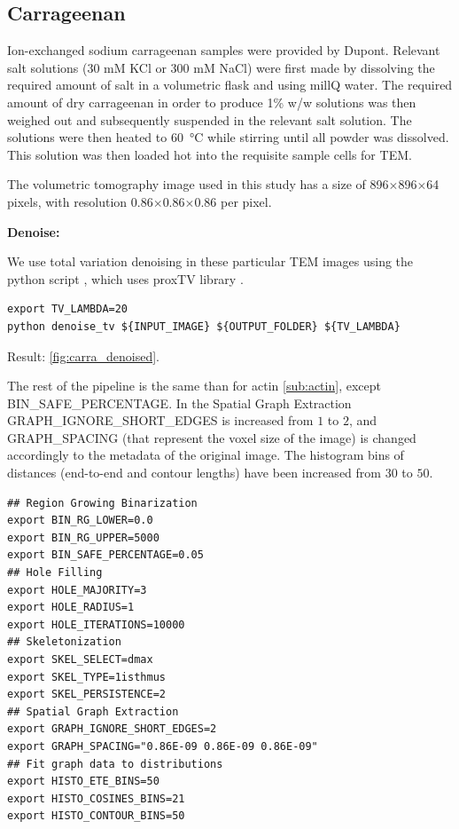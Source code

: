 \subsection{Carrageenan}%
\label{sub:carrageenan}


Ion-exchanged sodium carrageenan samples were provided by Dupont. Relevant salt solutions (30 mM KCl  or 300 mM NaCl) were first made by dissolving the required amount of salt in a volumetric flask and using millQ water. The required amount of dry carrageenan in order to produce 1\% w/w solutions was then weighed out and subsequently suspended in the relevant salt solution. The solutions were then heated to \SI{60}{\degreeCelsius} while stirring until all powder was dissolved. This solution was then loaded hot into the requisite sample cells for \gls{TEM}.

The volumetric tomography image used in this study has a size of 896$\times$896$\times$64 pixels, with resolution 0.86$\times$0.86$\times$0.86 \nm per pixel.

\textbf{Denoise:}

We use total variation denoising in these particular TEM images using the python script  \cite{phcerdan_denoise_tv_2018}, which uses proxTV library \cite{barbero_modular_2014}.

\begin{verbatim}
export TV_LAMBDA=20
python denoise_tv ${INPUT_IMAGE} ${OUTPUT_FOLDER} ${TV_LAMBDA}
\end{verbatim}

Result: \autoref{fig:carra_denoised}.

The rest of the pipeline is the same than for actin \autoref{sub:actin}, except BIN\_SAFE\_PERCENTAGE.
In the Spatial Graph Extraction GRAPH\_IGNORE\_SHORT\_EDGES is increased from $1$ to $2$,
and GRAPH\_SPACING (that represent the voxel size of the image) is changed accordingly to the metadata of the original image.
The histogram bins of distances (end-to-end and contour lengths) have been increased from $30$ to $50$.

\begin{verbatim}
## Region Growing Binarization
export BIN_RG_LOWER=0.0
export BIN_RG_UPPER=5000
export BIN_SAFE_PERCENTAGE=0.05
## Hole Filling
export HOLE_MAJORITY=3
export HOLE_RADIUS=1
export HOLE_ITERATIONS=10000
## Skeletonization
export SKEL_SELECT=dmax
export SKEL_TYPE=1isthmus
export SKEL_PERSISTENCE=2
## Spatial Graph Extraction
export GRAPH_IGNORE_SHORT_EDGES=2
export GRAPH_SPACING="0.86E-09 0.86E-09 0.86E-09"
## Fit graph data to distributions
export HISTO_ETE_BINS=50
export HISTO_COSINES_BINS=21
export HISTO_CONTOUR_BINS=50
\end{verbatim}

